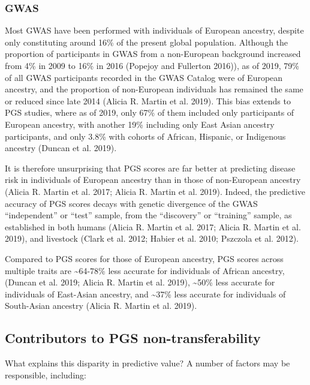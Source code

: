 \documentclass[
]{book}
\begin{document}
\hypertarget{gwas}{%
\subsubsection{GWAS}\label{gwas}}

Most GWAS have been performed with individuals of European ancestry, despite only constituting around 16\% of the present global population. Although the proportion of participants in GWAS from a non-European background increased from 4\% in 2009 to 16\% in 2016 (Popejoy and Fullerton 2016)), as of 2019, 79\% of all GWAS participants recorded in the GWAS Catalog were of European ancestry, and the proportion of non-European individuals has remained the same or reduced since late 2014 (Alicia R. Martin et al. 2019). This bias extends to PGS studies, where as of 2019, only 67\% of them included only participants of European ancestry, with another 19\% including only East Asian ancestry participants, and only 3.8\% with cohorts of African, Hispanic, or Indigenous ancestry (Duncan et al. 2019).

It is therefore unsurprising that PGS scores are far better at predicting disease risk in individuals of European ancestry than in those of non-European ancestry (Alicia R. Martin et al. 2017; Alicia R. Martin et al. 2019). Indeed, the predictive accuracy of PGS scores decays with genetic divergence of the GWAS ``independent'' or ``test'' sample, from the ``discovery'' or ``training'' sample, as established in both humans (Alicia R. Martin et al. 2017; Alicia R. Martin et al. 2019), and livestock (Clark et al. 2012; Habier et al. 2010; Pszczola et al. 2012).

Compared to PGS scores for those of European ancestry, PGS scores across multiple traits are \textasciitilde64-78\% less accurate for individuals of African ancestry, (Duncan et al. 2019; Alicia R. Martin et al. 2019), \textasciitilde50\% less accurate for individuals of East-Asian ancestry, and \textasciitilde37\% less accurate for individuals of South-Asian ancestry (Alicia R. Martin et al. 2019).

\hypertarget{contributors-to-pgs-non-transferability}{%
\subsection{Contributors to PGS non-transferability}\label{contributors-to-pgs-non-transferability}}

What explains this disparity in predictive value? A number of factors may be responsible, including:
\end{document}
